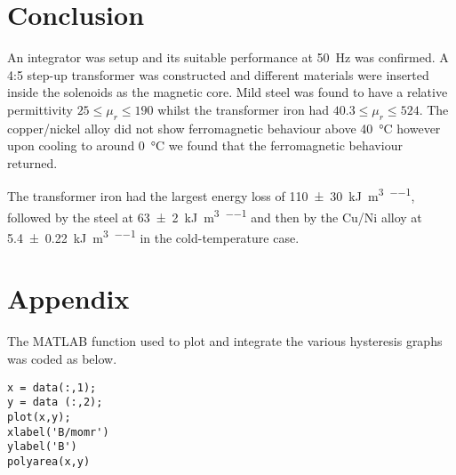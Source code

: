 \documentclass[12pt]{article}
\begin{document}
\section{Conclusion}
An integrator was setup and its suitable performance at \SI{50}{\hertz} was confirmed. A 4:5 step-up transformer was constructed and different materials were inserted inside the solenoids as the magnetic core. Mild steel was found to have a relative permittivity $25 \leq \mu_r \leq 190$ whilst the transformer iron had $40.3 \leq \mu_r \leq 524$. The copper/nickel alloy did not show ferromagnetic behaviour above \SI{40}{\celsius} however upon cooling to around \SI{0}{\celsius} we found that the ferromagnetic behaviour returned.

The transformer iron had the largest energy loss of \SI{110 \pm 30}{\kilo\joule\per\metre\cubed\per{}}, followed by the steel at \SI{63 \pm 2}{\kilo\joule\per\metre\cubed\per{}} and then by the Cu/Ni alloy at \SI{5.4 \pm 0.22}{\kilo\joule\per\metre\cubed\per{}} in the cold-temperature case.







\section{Appendix}
The MATLAB function used to plot and integrate the various hysteresis graphs was coded as below.
\begin{lstlisting}
x = data(:,1);
y = data (:,2);
plot(x,y);
xlabel('B/momr')
ylabel('B')
polyarea(x,y)
\end{lstlisting}
\end{document}
